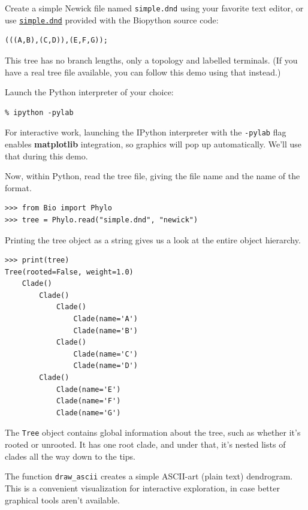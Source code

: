 \documentclass{report}
\begin{document}
Create a simple Newick file named \texttt{simple.dnd} using your favorite text editor,
or use \href{http://biopython.org/SRC/biopython/Doc/examples/simple.dnd}{\texttt{simple.dnd}}
provided with the Biopython source code:

\begin{verbatim}
(((A,B),(C,D)),(E,F,G));
\end{verbatim}

This tree has no branch lengths, only a topology and labelled terminals. (If you have a real
tree file available, you can follow this demo using that instead.)

Launch the Python interpreter of your choice:

\begin{verbatim}
% ipython -pylab
\end{verbatim}

For interactive work, launching the IPython interpreter with the \verb|-pylab| flag enables
\textbf{matplotlib} integration, so graphics will pop up automatically. We'll use that during
this demo.

Now, within Python, read the tree file, giving the file name and the name of the format.

\begin{verbatim}
>>> from Bio import Phylo
>>> tree = Phylo.read("simple.dnd", "newick")
\end{verbatim}

Printing the tree object as a string gives us a look at the entire object hierarchy.

\begin{verbatim}
>>> print(tree)
Tree(rooted=False, weight=1.0)
    Clade()
        Clade()
            Clade()
                Clade(name='A')
                Clade(name='B')
            Clade()
                Clade(name='C')
                Clade(name='D')
        Clade()
            Clade(name='E')
            Clade(name='F')
            Clade(name='G')
\end{verbatim}

The \texttt{Tree} object contains global information about the tree, such as whether it's
rooted or unrooted. It has one root clade, and under that, it's nested lists of clades all the
way down to the tips.

The function \verb|draw_ascii| creates a simple ASCII-art (plain text) dendrogram.  This is a
convenient visualization for interactive exploration, in case better graphical tools aren't
available.
\end{document}
